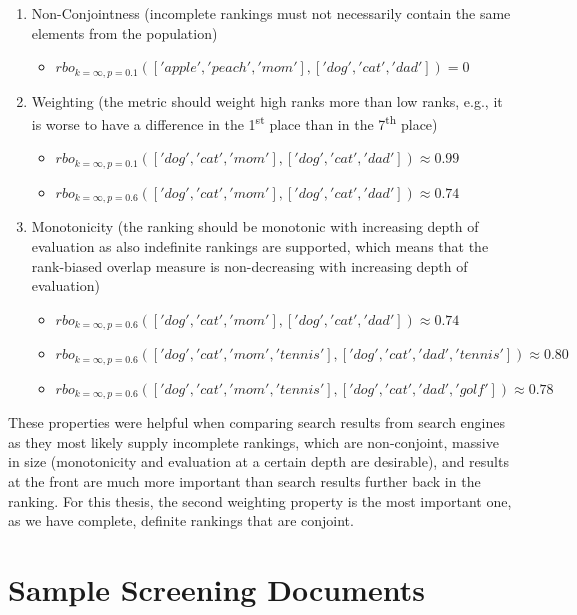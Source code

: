 \documentclass[draft,final]{thesisclass} %
\begin{document}
\begin{enumerate}
\item Non-Conjointness (incomplete rankings must not necessarily contain the same elements from the population)
\begin{itemize}
    \item $rbo_{k=\infty,p=0.1}(['apple','peach','mom'],['dog','cat','dad']) = 0$
\end{itemize}
\item Weighting (the metric should weight high ranks more than low ranks, e.g., it is worse to have a difference in the 1\textsuperscript{st} place than in the 7\textsuperscript{th} place)
\begin{itemize}
    \item $rbo_{k=\infty,p=0.1}(['dog','cat','mom'],['dog','cat','dad']) \approx 0.99$
    \item $rbo_{k=\infty,p=0.6}(['dog','cat','mom'],['dog','cat','dad']) \approx 0.74$
\end{itemize}
\item Monotonicity (the ranking should be monotonic with increasing depth of evaluation as also indefinite rankings are supported, which means that the rank-biased overlap measure is non-decreasing with increasing depth of evaluation)
\begin{itemize}
    \item $rbo_{k=\infty,p=0.6}(['dog','cat','mom'],['dog','cat','dad']) \approx 0.74$
    \item $rbo_{k=\infty,p=0.6}(['dog','cat','mom','tennis'],['dog','cat','dad','tennis']) \approx 0.80$
    \item $rbo_{k=\infty,p=0.6}(['dog','cat','mom','tennis'],['dog','cat','dad','golf']) \approx 0.78$
\end{itemize}
\end{enumerate}
These properties were helpful when comparing search results from search engines as they most likely supply incomplete rankings, which are non-conjoint, massive in size (monotonicity and evaluation at a certain depth are desirable), and results at the front are much more important than search results further back in the ranking.
For this thesis, the second weighting property is the most important one, as we have complete, definite rankings that are conjoint.

\section{Sample Screening Documents} \label{sample_screening_documents}
\end{document}
